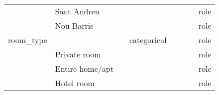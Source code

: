 \begin{center}
\begin{xltabular}{\textwidth}{llXlllll}
                            & Sant Andreu                 &                                   &             &                &                             &                     & role \\
                            & Nou Barris                  &                                   &             &                &                             &                     & role \\
room\_type                  &                             &                                   & categorical &                &                             &                     & role \\
                            & Private room                &                                   &             &                &                             &                     & role \\
                            & Entire home/apt  &                                   &             &                &                             &                     & role \\
                                                        & Hotel room  &                                   &             &                &                             &                     & role \\


\end{xltabular}
\end{center}
